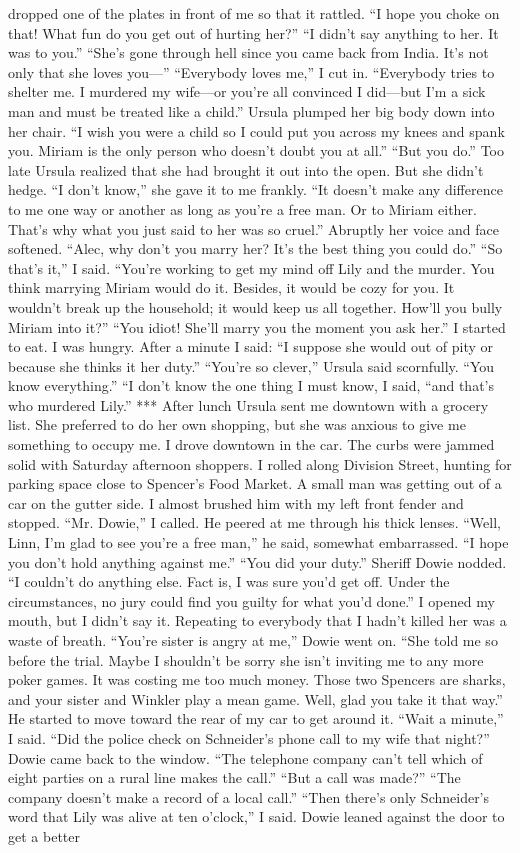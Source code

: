 \documentclass{novel}
\begin{document}
dropped one of the plates in front of me so that it rattled. “I hope you choke on that! What fun do you get out of hurting her?” “I didn’t say anything to her. It was to you.” “She’s gone through hell since you came back from India. It’s not only that she loves you—” “Everybody loves me,” I cut in. “Everybody tries to shelter me. I murdered my wife—or you’re all convinced I did—but I’m a sick man and must be treated like a child.” Ursula plumped her big body down into her chair. “I wish you were a child so I could put you across my knees and spank you. Miriam is the only person who doesn’t doubt you at all.” “But you do.” Too late Ursula realized that she had brought it out into the open. But she didn’t hedge. “I don’t know,” she gave it to me frankly. “It doesn’t make any difference to me one way or another as long as you’re a free man. Or to Miriam either. That’s why what you just said to her was so cruel.” Abruptly her voice and face softened. “Alec, why don’t you marry her? It’s the best thing you could do.” “So that’s it,” I said. “You’re working to get my mind off Lily and the murder. You think marrying Miriam would do it. Besides, it would be cozy for you. It wouldn’t break up the household; it would keep us all together. How’ll you bully Miriam into it?” “You idiot! She’ll marry you the moment you ask her.” I started to eat. I was hungry. After a minute I said: “I suppose she would out of pity or because she thinks it her duty.” “You’re so clever,” Ursula said scornfully. “You know everything.” “I don’t know the one thing I must know, I said, “and that’s who murdered Lily.” *** After lunch Ursula sent me downtown with a grocery list. She preferred to do her own shopping, but she was anxious to give me something to occupy me. I drove downtown in the car. The curbs were jammed solid with Saturday afternoon shoppers. I rolled along Division Street, hunting for parking space close to Spencer’s Food Market. A small man was getting out of a car on the gutter side. I almost brushed him with my left front fender and stopped. “Mr. Dowie,” I called. He peered at me through his thick lenses. “Well, Linn, I’m glad to see you’re a free man,” he said, somewhat embarrassed. “I hope you don’t hold anything against me.” “You did your duty.” Sheriff Dowie nodded. “I couldn’t do anything else. Fact is, I was sure you’d get off. Under the circumstances, no jury could find you guilty for what you’d done.” I opened my mouth, but I didn’t say it. Repeating to everybody that I hadn’t killed her was a waste of breath. “You’re sister is angry at me,” Dowie went on. “She told me so before the trial. Maybe I shouldn’t be sorry she isn’t inviting me to any more poker games. It was costing me too much money. Those two Spencers are sharks, and your sister and Winkler play a mean game. Well, glad you take it that way.” He started to move toward the rear of my car to get around it. “Wait a minute,” I said. “Did the police check on Schneider’s phone call to my wife that night?” Dowie came back to the window. “The telephone company can’t tell which of eight parties on a rural line makes the call.” “But a call was made?” “The company doesn’t make a record of a local call.” “Then there’s only Schneider’s word that Lily was alive at ten o’clock,” I said. Dowie leaned against the door to get a better 
\end{document}
